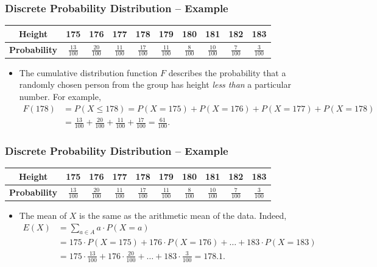\documentclass[aspectratio=169,11pt,usenames,dvipsnames,handout]{beamer}
\begin{document}
\begin{frame}
 \frametitle{Discrete Probability Distribution -- Example}
 \begin{center}
  \begin{tabular}{c|ccccccccc}
   \textbf{Height} & 175 & 176 & 177 & 178 & 179 & 180 & 181 & 182 & 183\\
   \midrule
   \textbf{Probability} & $\frac{13}{100}$ & $\frac{20}{100}$ & $\frac{11}{100}$
                        & $\frac{17}{100}$ & $\frac{11}{100}$ & $\frac{8}{100}$
                        & $\frac{10}{100}$ & $\frac{7}{100}$ & $\frac{3}{100}$
  \end{tabular}
 \end{center}
 \begin{itemize}
  \item The \alert{cumulative distribution function} $F$ describes the
   probability that a randomly chosen person from the group has height
   \emph{less than} a particular number. \pause For example,
   \begin{align*}
    F(178) &= P(X \leq 178) = P(X = 175) + P(X = 176) + P(X = 177) + P(X =
    178)\\
           &= \frac{13}{100} + \frac{20}{100} + \frac{11}{100} + \frac{17}{100}
           = \frac{61}{100}.
   \end{align*}
 \end{itemize}
\end{frame}

\begin{frame}
 \frametitle{Discrete Probability Distribution -- Example}
 \begin{center}
  \begin{tabular}{c|ccccccccc}
   \textbf{Height} & 175 & 176 & 177 & 178 & 179 & 180 & 181 & 182 & 183\\
   \midrule
   \textbf{Probability} & $\frac{13}{100}$ & $\frac{20}{100}$ & $\frac{11}{100}$
                        & $\frac{17}{100}$ & $\frac{11}{100}$ & $\frac{8}{100}$
                        & $\frac{10}{100}$ & $\frac{7}{100}$ & $\frac{3}{100}$
  \end{tabular}
 \end{center}
 \begin{itemize}
  \item The \alert{mean} of $X$ is the same as the arithmetic mean of the data.
   Indeed,
   \begin{align*}
    E(X) &= \sum_{a \in A} a \cdot P(X = a)\\
         &= 175 \cdot P(X = 175) + 176 \cdot P(X = 176) + \ldots + 183 \cdot P(X
         = 183)\\
         &= 175 \cdot \frac{13}{100} + 176 \cdot \frac{20}{100} + \ldots + 183
         \cdot \frac{3}{100} = 178.1.
   \end{align*}
 \end{itemize}
\end{frame}
\end{document}
